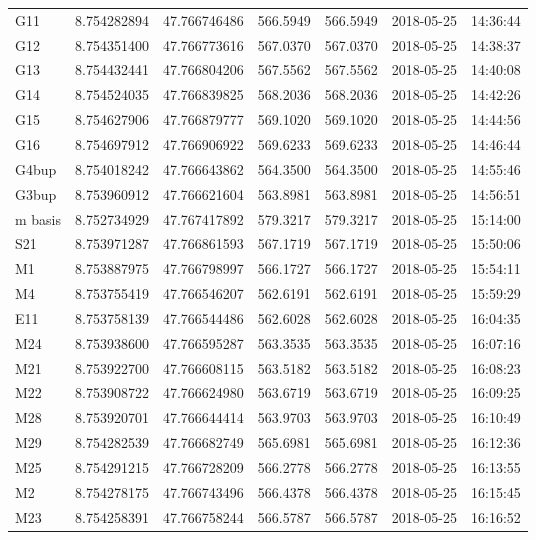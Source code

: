 \begin{table}[!ht]
\begin{tabular}{lllllll}
G11     & 8.754282894 & 47.766746486 & 566.5949 & 566.5949 & 2018-05-25 & 14:36:44 \\
G12     & 8.754351400 & 47.766773616 & 567.0370 & 567.0370 & 2018-05-25 & 14:38:37 \\
G13     & 8.754432441 & 47.766804206 & 567.5562 & 567.5562 & 2018-05-25 & 14:40:08 \\
G14     & 8.754524035 & 47.766839825 & 568.2036 & 568.2036 & 2018-05-25 & 14:42:26 \\
G15     & 8.754627906 & 47.766879777 & 569.1020 & 569.1020 & 2018-05-25 & 14:44:56 \\
G16     & 8.754697912 & 47.766906922 & 569.6233 & 569.6233 & 2018-05-25 & 14:46:44 \\
G4bup   & 8.754018242 & 47.766643862 & 564.3500 & 564.3500 & 2018-05-25 & 14:55:46 \\
G3bup   & 8.753960912 & 47.766621604 & 563.8981 & 563.8981 & 2018-05-25 & 14:56:51 \\
m basis & 8.752734929 & 47.767417892 & 579.3217 & 579.3217 & 2018-05-25 & 15:14:00 \\
S21     & 8.753971287 & 47.766861593 & 567.1719 & 567.1719 & 2018-05-25 & 15:50:06 \\
M1      & 8.753887975 & 47.766798997 & 566.1727 & 566.1727 & 2018-05-25 & 15:54:11 \\
M4      & 8.753755419 & 47.766546207 & 562.6191 & 562.6191 & 2018-05-25 & 15:59:29 \\
E11     & 8.753758139 & 47.766544486 & 562.6028 & 562.6028 & 2018-05-25 & 16:04:35 \\
M24     & 8.753938600 & 47.766595287 & 563.3535 & 563.3535 & 2018-05-25 & 16:07:16 \\
M21     & 8.753922700 & 47.766608115 & 563.5182 & 563.5182 & 2018-05-25 & 16:08:23 \\
M22     & 8.753908722 & 47.766624980 & 563.6719 & 563.6719 & 2018-05-25 & 16:09:25 \\
M28     & 8.753920701 & 47.766644414 & 563.9703 & 563.9703 & 2018-05-25 & 16:10:49 \\
M29     & 8.754282539 & 47.766682749 & 565.6981 & 565.6981 & 2018-05-25 & 16:12:36 \\
M25     & 8.754291215 & 47.766728209 & 566.2778 & 566.2778 & 2018-05-25 & 16:13:55 \\
M2      & 8.754278175 & 47.766743496 & 566.4378 & 566.4378 & 2018-05-25 & 16:15:45 \\
M23     & 8.754258391 & 47.766758244 & 566.5787 & 566.5787 & 2018-05-25 & 16:16:52 \\

\end{tabular}
\end{table}
